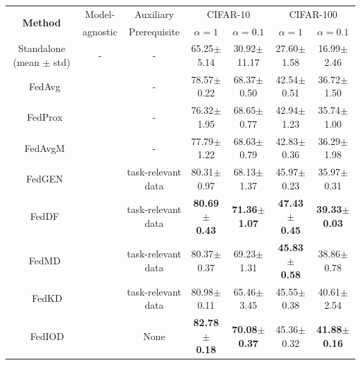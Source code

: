 \documentclass[letterpaper]{article} %
\newcommand{\cmark}{\ding{51}}%
\newcommand{\xmark}{\ding{55}}%
\begin{document}
\begin{table}[]
\centering
\resizebox{\textwidth}{!}
{
\begin{tabular}{cc|c|c|cc|cc}
\toprule
\multicolumn{2}{c|}{\multirow{2}{*}{\textbf{Method}}}
&Model- &Auxiliary  &
\multicolumn{2}{c|}{CIFAR-10} &
\multicolumn{2}{c}{CIFAR-100} \\
& %
&agnostic & Prerequisite
&$\alpha=1$ &$\alpha=0.1$ &$\alpha=1$ &$\alpha=0.1$ \\
\midrule
\multicolumn{2}{c|}{Standalone (mean $\pm$ std)}
&- &- &65.25$\pm$ 5.14 & 30.92$\pm$  11.17 &27.60$\pm$ 1.58 &16.99$\pm$ 2.46
\\ \midrule
\parbox[t]{6mm}{} &FedAvg~\cite{mcmahan2017communication}
&\xmark &-
&
78.57$\pm$ 0.22 &
68.37$\pm$ 0.50
&
42.54$\pm$ 0.51 &
36.72$\pm$ 1.50 \\
&FedProx~\cite{li2018federated}
&\xmark &-
&
76.32$\pm$ 1.95 &
68.65$\pm$ 0.77
&
42.94$\pm$ 1.23 &
35.74$\pm$ 1.00 \\
&FedAvgM~\cite{hsu2019measuring}
&\xmark &-
&
77.79$\pm$ 1.22 &
68.63$\pm$ 0.79
&
42.83$\pm$ 0.36 &
36.29$\pm$ 1.98 \\
&FedGEN~\cite{zhu2021data}
&\xmark &task-relevant data
&
80.31$\pm$ 0.97 &
68.13$\pm$ 1.37
&
45.97$\pm$ 0.23&
35.97$\pm$ 0.31\\
&FedDF~\cite{lin2020ensemble}
&\xmark &task-relevant data
&
\bf{80.69$\pm$ 0.43} &
\bf{71.36$\pm$ 1.07}
&
\bf{47.43$\pm$ 0.45} &
\bf{39.33$\pm$ 0.03} \\\midrule
\parbox[t]{6mm}{} &FedMD~\cite{li2019fedmd}
&\cmark & task-relevant data
&
80.37$\pm$ 0.37 &
{69.23}$\pm$ 1.31
&
\bf{45.83$\pm$ 0.58} &
38.86$\pm$ 0.78 \\
&FedKD \cite{gong2022preserving}
&\cmark &task-relevant data
&
{80.98}$\pm$ 0.11 & {65.46}$\pm$ 3.45 & {45.55}$\pm$ 0.38& {40.61}$\pm$ 2.54
\\
&FedIOD %
&\cmark &None &\bf{82.78$\pm$ 0.18} &\bf{70.08$\pm$ 0.37} &45.36$\pm$ 0.32 &\bf{41.88$\pm$ 0.16} \\
\bottomrule
\end{tabular}
}

\end{table}
\end{document}
